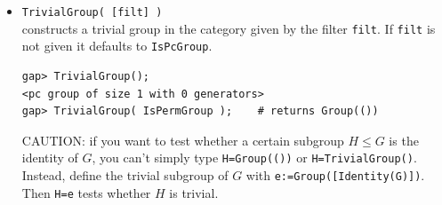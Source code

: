 \begin{itemize}
\item {\tt TrivialGroup( [filt] )}\\[2pt] 
constructs a trivial group in the category given by the filter {\tt filt}. If {\tt filt} is not given it defaults to
{\tt IsPcGroup}. %
{\codesize
\begin{verbatim}
gap> TrivialGroup();
<pc group of size 1 with 0 generators>
gap> TrivialGroup( IsPermGroup );    # returns Group(())
\end{verbatim}}
\noindent CAUTION: if you want to test whether a certain subgroup $H \leq G$ is the
identity of $G$, you can't simply type {\tt H=Group(())} or {\tt H=TrivialGroup()}.  
Instead, define the trivial subgroup of $G$ with {\tt e:=Group([Identity(G)])}.  Then
{\tt H=e} tests whether $H$ is trivial.


\end{itemize}
